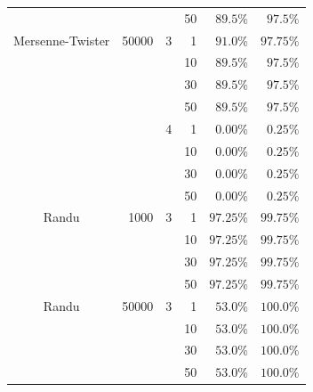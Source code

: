 \documentclass[12pt]{article}
\begin{document}
\begin{description}
\begin{table}[!h]
\begin{tabular}{c*{5}r}
		 &  &  & 50 & $89.5\%$ & $97.5\%$\\
		\cmidrule(lr){1-6}
		Mersenne-Twister & 50000 & 3 & 1 & $91.0\%$ & $97.75\%$\\
		 &  &  & 10 & $89.5\%$ & $97.5\%$\\
		 &  &  & 30 & $89.5\%$ & $97.5\%$\\
		 &  &  & 50 & $89.5\%$ & $97.5\%$\\ \cmidrule(lr){3-6}
		 &  & 4 & 1 & $0.00\%$ & $0.25\%$\\
		 &  &  & 10 & $0.00\%$ & $0.25\%$\\
		 &  &  & 30 & $0.00\%$ & $0.25\%$\\
		 &  &  & 50 & $0.00\%$ & $0.25\%$\\
		\cmidrule(lr){1-6}
		Randu & 1000 & 3 & 1 & $97.25\%$ & $99.75\%$\\
		 &  & & 10 & $97.25\%$ & $99.75\%$\\
		 &  & & 30 & $97.25\%$ & $99.75\%$\\
		 &  & & 50 & $97.25\%$ & $99.75\%$\\
		\cmidrule(lr){1-6}
		Randu & 50000 & 3 & 1 & $53.0\%$ & $100.0\%$\\
		 &  &  & 10 & $53.0\%$ & $100.0\%$\\
		 &  &  & 30 & $53.0\%$ & $100.0\%$\\
		 &  &  & 50 & $53.0\%$ & $100.0\%$\\
		\bottomrule
	\end{tabular}
	\end{table}


\end{description}
\end{document}

